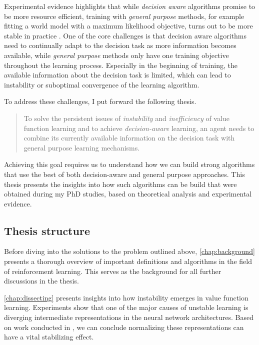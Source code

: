 Experimental evidence highlights that while \emph{decision aware} algorithms promise to be more resource efficient, training with \emph{general purpose} methods, for example fitting a world model with a maximum likelihood objective, turns out to be more stable in practice \parencite{vagram}.
One of the core challenges is that decision aware algorithms need to continually adapt to the decision task as more information becomes available, while \emph{general purpose} methods only have one training objective throughout the learning process.
Especially in the beginning of training, the available information about the decision task is limited, which can lead to instability or suboptimal convergence of the learning algorithm.

To address these challenges, I put forward the following thesis.

\begin{quote}
	To solve the persistent issues of \emph{instability} and \emph{inefficiency} of value function learning and to achieve \emph{decision-aware} learning, an agent needs to combine its currently available information on the decision task with general purpose learning mechanisms.
\end{quote}

Achieving this goal requires us to understand how we can build strong algorithms that use the best of both decision-aware and general purpose approaches.
This thesis presents the insights into how such algorithms can be build that were obtained during my PhD studies, based on theoretical analysis and experimental evidence.

\subsection{Thesis structure}

Before diving into the solutions to the problem outlined above, \autoref{chap:background} presents a thorough overview of important definitions and algorithms in the field of reinforcement learning.
This serves as the background for all further discussions in the thesis.

\autoref{chap:dissecting} presents insights into how instability emerges in value function learning.
Experiments show that one of the major causes of unstable learning is diverging intermediate representations in the neural network architectures.
Based on work conducted in \textcite{hussing2024dissecting}, we can conclude normalizing these representations can have a vital stabilizing effect.

